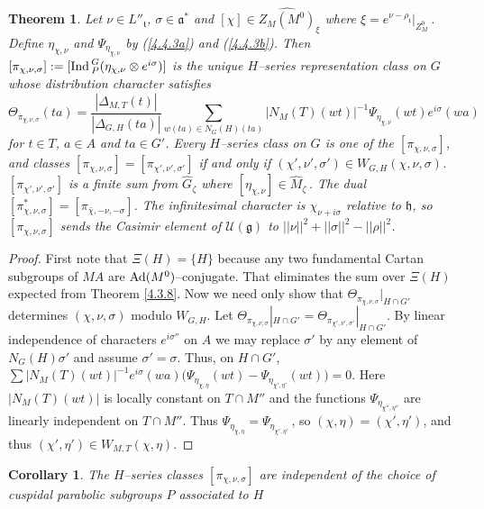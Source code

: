 \documentclass{conm-p-l}
\newtheorem{theorem}[equation]{Theorem}
\newtheorem{corollary}[equation]{Corollary}
\renewcommand{\gg}{\mathfrak{g}}
\def\ga{\mathfrak{a}}
\def\gg{\mathfrak{g}}
\def\gh{\mathfrak{h}}
\def\gt{\mathfrak{t}}
\def\Ad{{\rm Ad}}
\def\Ind{{\rm Ind\,}}
\def\cU{\mathcal{U}}
\begin{document}
\begin{theorem}\label{4.4.4}  Let $\nu \in L''_\gt$, $\sigma \in \ga^*$ and 
$[\chi] \in \widehat{Z_M(M^0)}_\xi$ where 
$\xi = e^{\nu - \rho_\gt}|_{Z_M^0}$\,.  Define $\eta_{\chi,\nu}$
and $\Psi_{\eta_{\chi,\nu}}$ by {\rm (\ref{4.4.3a})} and
{\rm (\ref{4.4.3b})}.  Then $[\pi_{\chi,\nu,\sigma}] :=
[\Ind_P^G(\eta_{\chi,\nu}\otimes e^{i\sigma})]$ is the unique $H$--series
representation class on $G$ whose distribution character satisfies
$$
\Theta_{\pi_{\chi,\nu,\sigma}}(ta)  
= \frac{|\Delta_{M,T}(t)|}{|\Delta_{G,H}(ta)|}
\sum_{w(ta)\in N_G(H)(ta)} |N_{M}(T)(wt)|^{-1} 
\Psi_{\eta_{\chi,\nu}}(wt) e^{i\sigma}(wa)
$$
for $t\in T$, $a \in A$ and $ta \in G'$.
Every $H$--series class on $G$ is one of the $[\pi_{\chi,\nu,\sigma}]$,
and classes $[\pi_{\chi,\nu,\sigma}] = [\pi_{\chi',\nu',\sigma'}]$
if and only if $(\chi',\nu',\sigma') \in W_{G,H}(\chi,\nu,\sigma)$.
$[\pi_{\chi',\nu',\sigma'}]$ is a finite sum from $\widehat{G}_\zeta$ where
$[\eta_{\chi,\nu}] \in \widehat{M}_\zeta$\,.  The dual 
$[\pi_{\chi,\nu,\sigma}^*] = [\pi_{\bar\chi,-\nu,-\sigma}]$.
The infinitesimal character is $\chi_{\nu + i\sigma}$ relative to $\gh$,
so $[\pi_{\chi,\nu,\sigma}]$ sends the Casimir element of
$\cU(\gg)$ to $||\nu||^2 + ||\sigma||^2 - ||\rho||^2$.
\end{theorem}

\begin{proof} First note that $\Xi(H) = \{H\}$ because any two fundamental
Cartan subgroups of $MA$ are $\Ad(M^0)$--conjugate.  That eliminates the
sum over $\Xi(H)$ expected from Theorem \ref{4.3.8}.  Now we need only 
show that $\Theta_{\pi_{\chi,\nu,\sigma}}|_{H\cap G'}$
determines $(\chi,\nu,\sigma)$ modulo $W_{G,H}$.  Let
$\Theta_{\pi_{\chi,\nu,\sigma}}|_{H\cap G'} =
\Theta_{\pi_{\chi',\nu',\sigma'}}|_{H\cap G'}$.
By linear independence of characters $e^{i\sigma''}$ on $A$ we may
replace $\sigma'$ by any element of $N_G(H)\sigma'$ and assume
$\sigma' = \sigma$.  Thus, on $H\cap G'$,
$\sum |N_M(T)(wt)|^{-1} e^{i\sigma}(wa)\bigl ( \Psi_{\eta_{\chi,\eta}}(wt)
- \Psi_{\eta_{\chi',\eta'}}(wt)\bigr ) = 0$.
Here $|N_M(T)(wt)|$ is locally constant on $T\cap M''$ and the functions 
$\Psi_{\eta_{\chi'',\eta''}}$ are linearly independent on $T\cap M''$.
Thus $\Psi_{\eta_{\chi,\eta}} = \Psi_{\eta_{\chi',\eta'}}$\,, so
$(\chi,\eta) = (\chi',\eta')$, and thus 
$(\chi',\eta') \in W_{M,T}(\chi,\eta)$.
\end{proof}

\begin{corollary}\label{4.4.5}
The $H$--series classes $[\pi_{\chi,\nu,\sigma}]$ are independent of
the choice of cuspidal parabolic subgroups $P$ associated to $H$
\end{corollary}
 
\end{document}

